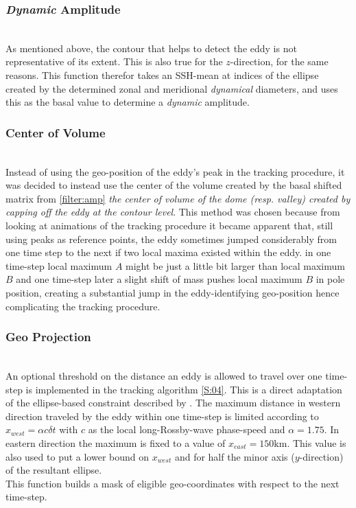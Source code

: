 \subsubsection{\textit{Dynamic} Amplitude} \label{filter:ampDyn}
\\
As mentioned above, the contour that helps to detect the eddy is not
representative of its extent. This is also true for the $z$-direction, for the
same reasons. This function therefor takes an SSH-mean at indices of the ellipse
created by the determined zonal and meridional \textit{dynamical} diameters,
and uses this as the basal value to determine a \textit{dynamic} amplitude.
\subsubsection{Center of Volume} \label{filter:CoV}
\\
Instead of using the geo-position of the eddy's peak in the tracking procedure,
it was decided to instead use the center of the volume created by the basal
shifted matrix from \ref{filter:amp} \ie \textit{the center of volume of the
dome
(resp. valley) created by capping off the eddy at the contour level}.
This method was chosen because from looking at animations of the tracking
procedure
it became apparent that, still using peaks as reference points, the eddy
sometimes jumped considerably from one time step to the next if two local maxima
existed within the eddy. \Eg in one time-step local maximum $A$ might be just a
little bit larger than local maximum $B$ and one time-step later a slight shift
of mass pushes local maximum $B$ in pole position, creating a substantial jump
in the eddy-identifying geo-position hence complicating the tracking procedure.
\subsubsection{Geo Projection}\label{filter:projLocs}
\\
An optional threshold on the distance an eddy is allowed to travel over one time-step is implemented in the tracking algorithm \ref{S:04}. This is a direct adaptation of the ellipse-based constraint described by \cite{chelton2011}. The maximum distance in western direction traveled by the eddy within one time-step is limited according to $x_{west} = \alpha c \delta{t} $ with $c$ as the local long-Rossby-wave phase-speed and \eg $\alpha=1.75$. In eastern direction the maximum is fixed to a value of \eg $x_{east} = 150\mathrm{km}$. This value is also used to put a lower bound on $x_{west}$ and for half the minor axis ($y$-direction) of the resultant ellipse.   \\
This function builds a mask of eligible geo-coordinates with respect to the next time-step.


